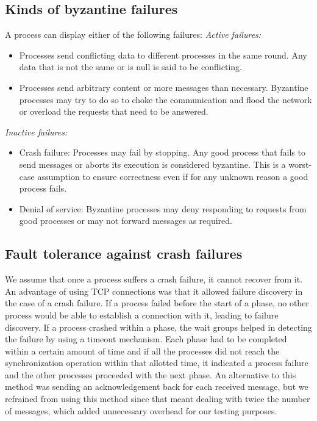 \subsection{Kinds of byzantine failures} \label{sec:behavior} A process can
display either of the following failures: \textit{Active failures:}
\begin{itemize} \item Processes send conflicting data to different processes in
            the same round. Any data that is not the same or is null is said to
            be conflicting.  \item Processes send arbitrary content or more
                messages than necessary. Byzantine processes may try to do so
                to choke the communication and flood the network or overload
                the requests that need to be answered.  \end{itemize}
            \textit{Inactive failures:} \begin{itemize} \item Crash failure:
                        Processes may fail by stopping. Any good process that
                        fails to send messages or aborts its execution is
                        considered byzantine. This is a worst-case assumption
                        to ensure correctness even if for any unknown reason
                        a good process fails.  \item Denial of service:
                            Byzantine processes may deny responding to requests
                            from good processes or may not forward messages as
                            required.  \end{itemize}

\subsection{Fault tolerance against crash failures} We assume that once
a process suffers a crash failure, it cannot recover from it. An advantage of
using TCP connections was that it allowed failure discovery in the case of
a crash failure. If a process failed before the start of a phase, no other
process would be able to establish a connection with it, leading to failure
discovery. If a process crashed within a phase, the wait groups helped in
detecting the failure by using a timeout mechanism. Each phase had to be
completed within a certain amount of time and if all the processes did not
reach the synchronization operation within that allotted time, it indicated
a process failure and the other processes proceeded with the next phase. 
An alternative to this method was sending an acknowledgement back for each
received message, but we refrained from using this method since that meant
dealing with twice the number of messages, which added unnecessary overhead for
our testing purposes. 

